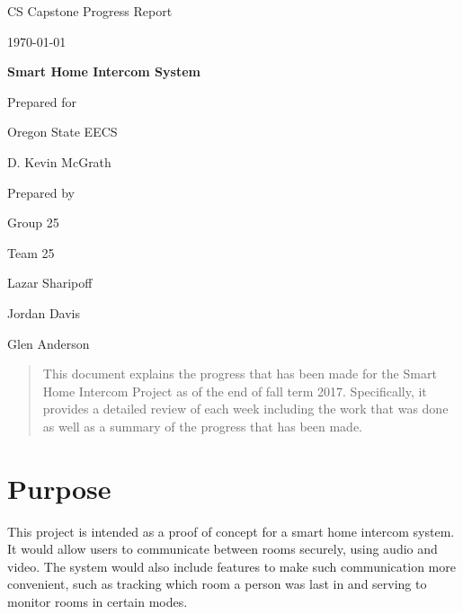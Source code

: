\documentclass[onecolumn, draftclsnofoot,10pt, compsoc]{IEEEtran}
\def \CapstoneTeamName{		Team 25}
\def \CapstoneTeamNumber{		25}
\def \GroupMemberOne{			Lazar Sharipoff}
\def \GroupMemberTwo{			Jordan Davis}
\def \GroupMemberThree{			Glen Anderson}
\def \CapstoneProjectName{		Smart Home Intercom System}
\def \CapstoneSponsorCompany{	Oregon State EECS}
\def \CapstoneSponsorPerson{		D. Kevin McGrath}
\def \CapstoneTeamName{		Team 25}
\def \CapstoneTeamNumber{		25}
\def \GroupMemberOne{			Lazar Sharipoff}
\def \GroupMemberTwo{			Jordan Davis}
\def \GroupMemberThree{			Glen Anderson}
\def \CapstoneProjectName{		Smart Home Intercom System}
\def \CapstoneSponsorCompany{	Oregon State EECS}
\def \CapstoneSponsorPerson{		D. Kevin McGrath}
\def \DocType{		%
				Progress Report
				}
\newcommand{\NameSigPair}[1]{\par
\makebox[2.75in][r]{#1} \hfil 	\makebox[3.25in]{\makebox[2.25in]{\hrulefill} \hfill		\makebox[.75in]{\hrulefill}}
\par\vspace{-12pt} \textit{\tiny\noindent
\makebox[2.75in]{} \hfil		\makebox[3.25in]{\makebox[2.25in][r]{Signature} \hfill	\makebox[.75in][r]{Date}}}}
\renewcommand{\NameSigPair}[1]{#1}
\begin{document}
\begin{titlepage}
\begin{singlespace}
\hfill
\par\vspace{.2in}
\centering
\scshape{
\huge CS Capstone \DocType \par
{\large\today}\par
\vspace{.5in}
\textbf{\Huge\CapstoneProjectName}\par
\vfill
{\large Prepared for}\par
\Huge \CapstoneSponsorCompany\par
\vspace{5pt}
{\Large\NameSigPair{\CapstoneSponsorPerson}\par}
{\large Prepared by }\par
Group\CapstoneTeamNumber\par
\CapstoneTeamName\par
\vspace{5pt}
{\Large
\NameSigPair{\GroupMemberOne}\par
\NameSigPair{\GroupMemberTwo}\par
\NameSigPair{\GroupMemberThree}\par
}
\vspace{20pt}
}
\begin{abstract}
	This document explains the progress that has been made for the Smart Home Intercom Project as of the end of fall term 2017. Specifically, it provides a detailed review of each week including the work that was done as well as a summary of the progress that has been made. 
\end{abstract}
\end{singlespace}
\end{titlepage}
\newpage
{}
\tableofcontents
\clearpage

\section{Purpose}
This project is intended as a proof of concept for a smart home intercom system. It would allow users to communicate between rooms securely, using audio and video. The system would also include features to make such communication more convenient, such as tracking which room a person was last in and serving to monitor rooms in certain modes. 
\end{document}
